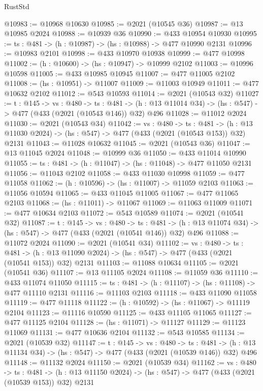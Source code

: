 \begin{lexlean}{RustStd}
\begin{coremodule}
{\begin{coremodule}
{{{{{{{{{{{{{{{{@10983 := @10968 @10630
@10985 := @2021 (@10545 @36)
@10987 := @13 @10985 @2024
@10988 := @10939 @36
@10990 := @433 @10954 @10930
@10995 := {ts : @481} -> (h : @10987) -> (hs : @10988) -> @477 @10990 @2131
@10996 := @10983 @2101
@10998 := @433 @10970 @10938
@10999 := @477 @10998
@11002 := (h : @10600) -> (hs : @10947) -> @10999 @2102
@11003 := @10996 @10598
@11005 := @433 @10985 @10945
@11007 := @477 @11005 @2102
@11008 := (hs : @10951) -> @11007
@11009 := @11003 @10949
@11011 := @477 @10632 @2102
@11012 := @543 @10593
@11014 := @2021 (@10543 @32)
@11027 := {t : @145} ->
  {vs : @480} ->
  {ts : @481} -> (h : @13 @11014 @34) -> (hs : @547) -> @477 (@433 (@2021 (@10543 @146)) @32) @496
@11028 := @11012 @2024
@11030 := @2021 (@10543 @34)
@11042 := {vs : @480} ->
  {ts : @481} ->
  (h : @13 @11030 @2024) -> (hs : @547) -> @477 (@433 (@2021 (@10543 @153)) @32) @2131
@11043 := @11028 @10632
@11045 := @2021 (@10543 @36)
@11047 := @13 @11045 @2024
@11048 := @10999 @36
@11050 := @433 @11014 @10990
@11055 := {ts : @481} -> (h : @11047) -> (hs : @11048) -> @477 @11050 @2131
@11056 := @11043 @2102
@11058 := @433 @11030 @10998
@11059 := @477 @11058
@11062 := (h : @10596) -> (hs : @11007) -> @11059 @2103
@11063 := @11056 @10594
@11065 := @433 @11045 @11005
@11067 := @477 @11065 @2103
@11068 := (hs : @11011) -> @11067
@11069 := @11063 @11009
@11071 := @477 @10634 @2103
@11072 := @543 @10589
@11074 := @2021 (@10541 @32)
@11087 := {t : @145} ->
  {vs : @480} ->
  {ts : @481} -> (h : @13 @11074 @34) -> (hs : @547) -> @477 (@433 (@2021 (@10541 @146)) @32) @496
@11088 := @11072 @2024
@11090 := @2021 (@10541 @34)
@11102 := {vs : @480} ->
  {ts : @481} ->
  (h : @13 @11090 @2024) -> (hs : @547) -> @477 (@433 (@2021 (@10541 @153)) @32) @2131
@11103 := @11088 @10634
@11105 := @2021 (@10541 @36)
@11107 := @13 @11105 @2024
@11108 := @11059 @36
@11110 := @433 @11074 @11050
@11115 := {ts : @481} -> (h : @11107) -> (hs : @11108) -> @477 @11110 @2131
@11116 := @11103 @2103
@11118 := @433 @11090 @11058
@11119 := @477 @11118
@11122 := (h : @10592) -> (hs : @11067) -> @11119 @2104
@11123 := @11116 @10590
@11125 := @433 @11105 @11065
@11127 := @477 @11125 @2104
@11128 := (hs : @11071) -> @11127
@11129 := @11123 @11069
@11131 := @477 @10636 @2104
@11132 := @543 @10585
@11134 := @2021 (@10539 @32)
@11147 := {t : @145} ->
  {vs : @480} ->
  {ts : @481} -> (h : @13 @11134 @34) -> (hs : @547) -> @477 (@433 (@2021 (@10539 @146)) @32) @496
@11148 := @11132 @2024
@11150 := @2021 (@10539 @34)
@11162 := {vs : @480} ->
  {ts : @481} ->
  (h : @13 @11150 @2024) -> (hs : @547) -> @477 (@433 (@2021 (@10539 @153)) @32) @2131
}}}}}}}}}}}}}}}}
\end{coremodule}}
\end{coremodule}
\end{lexlean}
